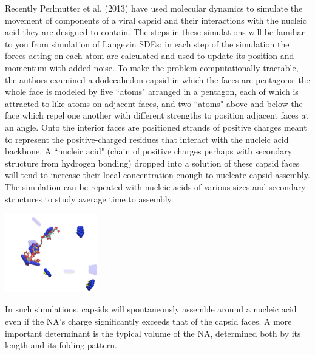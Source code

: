 \documentclass{article}
\begin{document}
Recently Perlmutter et al. (2013) have used molecular dynamics to simulate the movement of components of a viral capsid and their interactions with the nucleic acid they are designed to contain. The steps in these simulations will be familiar to you from simulation of Langevin SDEs: in each step of the simulation the forces acting on each atom are calculated and used to update its position and momentum with added noise. To make the problem computationally tractable, the authors examined a dodecahedon capsid in which the faces are pentagons: the whole face is modeled by five ``atoms" arranged in a pentagon, each of which is attracted to like atoms on adjacent faces, and two ``atoms" above and below the face which repel one another with different strengths to position adjacent faces at an angle. Onto the interior faces are positioned strands of positive charges meant to represent the positive-charged residues that interact with the nucleic acid backbone. A ``nucleic acid" (chain of positive charges perhaps with secondary structure from hydrogen bonding) dropped into a solution of these capsid faces will tend to increase their local concentration enough to nucleate capsid assembly. The simulation can be repeated with nucleic acids of various sizes and secondary structures to study average time to assembly.\\

\begin{center}
\includegraphics[width=0.3\textwidth]{assembly.pdf}
\end{center}

In such simulations, capsids will spontaneously assemble around a nucleic acid even if the NA's charge significantly exceeds that of the capsid faces. A more important determinant is the typical volume of the NA, determined both by its length and its folding pattern.\\
\end{document}
